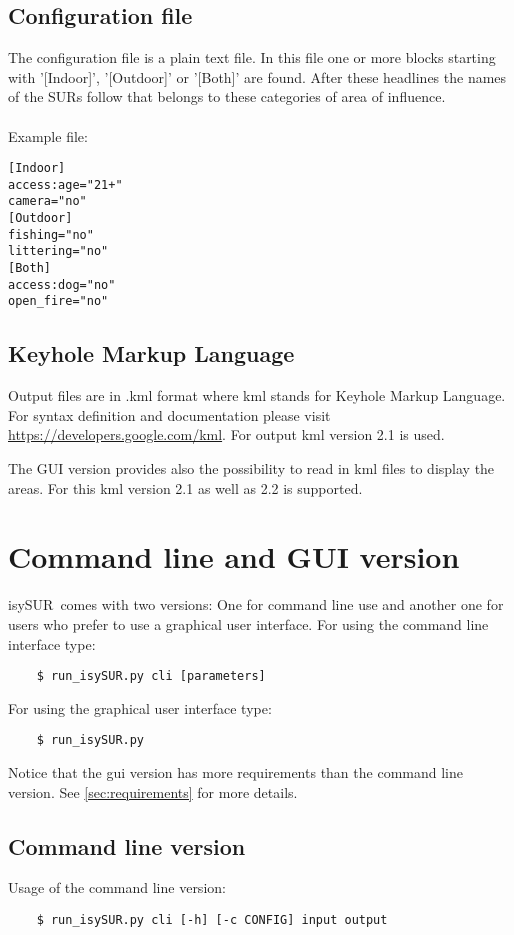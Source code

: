 \documentclass[11pt,fleqn]{book} %
\newcommand{\ProjectTitle}{isySUR}
\newcommand{\pt}{\ProjectTitle}
\begin{document}
\subsection{Configuration file}
The configuration file is a plain text file. In this file one or more blocks starting with '[Indoor]', '[Outdoor]' or '[Both]' are found. After these headlines the names of the SURs follow that belongs to these categories of area of influence.
\\~\\
Example file:
\begin{verbatim}
[Indoor]
access:age="21+"
camera="no"
[Outdoor]
fishing="no"
littering="no"
[Both]
access:dog="no"
open_fire="no"
\end{verbatim}

\subsection{Keyhole Markup Language}
Output files are in .kml format where kml stands for Keyhole Markup Language. For syntax definition and documentation please visit \url{https://developers.google.com/kml}. For output kml version 2.1 is used.

The GUI version provides also the possibility to read in kml files to display the areas. For this kml version 2.1 as well as 2.2 is supported.

\section{Command line and GUI version}\label{sec:usage}
\pt\ comes with two versions: One for command line use and another one for users who prefer to use a graphical user interface.
For using the command line interface type:
\begin{verbatim}
	$ run_isySUR.py cli [parameters]
\end{verbatim}
For using the graphical user interface type:
\begin{verbatim}
	$ run_isySUR.py
\end{verbatim}

Notice that the gui version has more requirements than the command line version. See \ref{sec:requirements} for more details.

\subsection{Command line version}\label{sec:cli}
Usage of the command line version:
\begin{verbatim}
	$ run_isySUR.py cli [-h] [-c CONFIG] input output
\end{verbatim}
\end{document}
